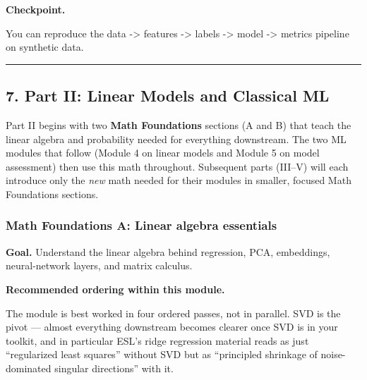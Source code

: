 \textbf{Checkpoint.}

You can reproduce the data -\textgreater{} features -\textgreater{}
labels -\textgreater{} model -\textgreater{} metrics pipeline on
synthetic data.

\begin{center}\rule{0.5\linewidth}{0.5pt}\end{center}

\subsection{7. Part II: Linear Models and Classical
ML}\label{part-ii-linear-models-and-classical-ml}

Part II begins with two \textbf{Math Foundations} sections (A and B)
that teach the linear algebra and probability needed for everything
downstream. The two ML modules that follow (Module 4 on linear models
and Module 5 on model assessment) then use this math throughout.
Subsequent parts (III--V) will each introduce only the \emph{new} math
needed for their modules in smaller, focused Math Foundations sections.

\subsubsection{Math Foundations A: Linear algebra
essentials}\label{math-foundations-a-linear-algebra-essentials}

\textbf{Goal.} Understand the linear algebra behind regression, PCA,
embeddings, neural-network layers, and matrix calculus.

\textbf{Recommended ordering within this module.}

The module is best worked in four ordered passes, not in parallel. SVD
is the pivot --- almost everything downstream becomes clearer once SVD
is in your toolkit, and in particular ESL's ridge regression material
reads as just ``regularized least squares'' without SVD but as
``principled shrinkage of noise-dominated singular directions'' with it.

